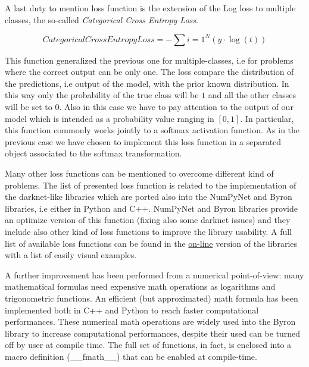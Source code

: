 \documentclass{standalone}
\begin{document}
A last duty to mention loss function is the extension of the Log loss to multiple classes, the so-called \emph{Categorical Cross Entropy Loss}.

$$
CategoricalCrossEntropyLoss = -\sum{i=1}^{N}\left( y\cdot\log(t) \right)
$$

This function generalized the previous one for multiple-classes, i.e for problems where the correct output can be only one.
The loss compare the distribution of the predictions, i.e output of the model, with the prior known distribution.
In this way only the probability of the true class will be $1$ and all the other classes will be set to $0$.
Also in this case we have to pay attention to the output of our model which is intended as a probability value ranging in $[0, 1]$.
In particular, this function commonly works jointly to a softmax activation function.
As in the previous case we have chosen to implement this loss function in a separated object associated to the softmax transformation.

Many other loss functions can be mentioned to overcome different kind of problems.
The list of presented loss function is related to the implementation of the \textsf{darknet}-like libraries which are ported also into the \textsf{NumPyNet} and \textsf{Byron} libraries, i.e either in \textsf{Python} and \textsf{C++}.
\textsf{NumPyNet} and \textsf{Byron} libraries provide an optimize version of this function (fixing also some \textsf{darknet} issues) and they include also other kind of loss functions to improve the library usability.
A full list of available loss functions can be found in the \href{https://github.com/Nico-Curti/Byron/blob/master/src/cost_layer.cpp}{on-line} version of the libraries with a list of easily visual examples.

A further improvement has been performed from a numerical point-of-view: many mathematical formulas need expensive math operations as logarithms and trigonometric functions.
An efficient (but approximated) math formula has been implemented both in \textsf{C++} and \textsf{Python} to reach faster computational performances.
These numerical math operations are widely used into the \textsf{Byron} library to increase computational performances, despite their used can be turned off by user at compile time.
The full set of functions, in fact, is enclosed into a \textsf{macro} definition (\textsf{\_\_fmath\_\_}) that can be enabled at compile-time.
\end{document}
